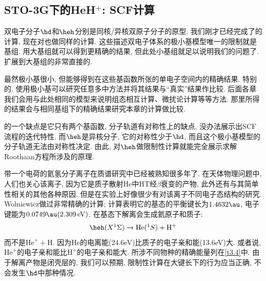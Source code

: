 \subsection{STO-3G下的HeH$^+$: SCF计算}
\label{sec3.5.3}
双电子分子$\hd$和$\heh$分别是同核/异核双原子分子的原型. 
我们刚才已经完成了的计算, 
现在对也做同样的计算. 
这些描述双电子体系的极小基模型唯一的限制就是基组. 
用大基组就可以得到更精确的结果, 
但此处小基组就足以说明我们的问题了. 
扩展到大基组的非常直接的. 


最然极小基很小, 
但能够得到在这些基函数所张的单电子空间内的精确结果. 
特别的, 
使用极小基可以研究任意多中方法并将其结果与``真实''结果作比较. 
后面各章我们会用与此处相同的模型来说明组态相互计算、微扰论计算等等方法. 
那里所得的结果会与相同基组下的精确结果研究本章的\hft 计算做比较.


的一个缺点是它只有两个基函数, 
分子轨道有对称性上的缺点, 没办法展示出SCF流程的迭代特性. 
而$\heh$是异核分子, 它的对称性少于$\hd$, 而且这个极小基模型的分子轨道无法由对称性决定. 
由此, 对$\heh$做限制性\hft 计算就能完全展示求解Roothaan方程所涉及的原理. 

带一个电荷的氦氢分子离子在质谱研究中已经被熟知很多年了.
在天体物理问题中, 人们也关心该离子, 
因为它是质子散射$\mathrm{He}$中$\mathrm{HT}$经$\beta$衰变的产物,
此外还有与其简单性相关的其他各种原因. 
但是在实验上好像很少有对该离子不同电子态结构的研究.
Wolniewicz做过非常精确的计算; 计算表明它的基态的平衡键长为$1.4632\au$, 电子键能为$0.0749\au(2.309\,\mathrm{eV})$. 
在基态下解离会生成氦原子和质子:
\begin{align}
	\heh(X^1\Sigma) \to \mathrm{He}(^1S) + \mathrm{H}^+
\end{align}
而不是$\mathrm{He}^+ + \mathrm{H}$. 
因为$\mathrm{He}$的电离能(24.6eV)比质子的电子亲和能(13.6eV)大. 
或者说, 
$\mathrm{He}^+$的电子亲和能比$\mathrm{H}^+$的电子亲和能大. 
所涉不同物种的精确能量列在\autoref{t3.4}中. 
由于解离产物是闭壳层的, 
我们可以预期, 
限制性\hft 计算在大键长下的行为应当正确, 
不会发生$\hd$中那种情况. 

